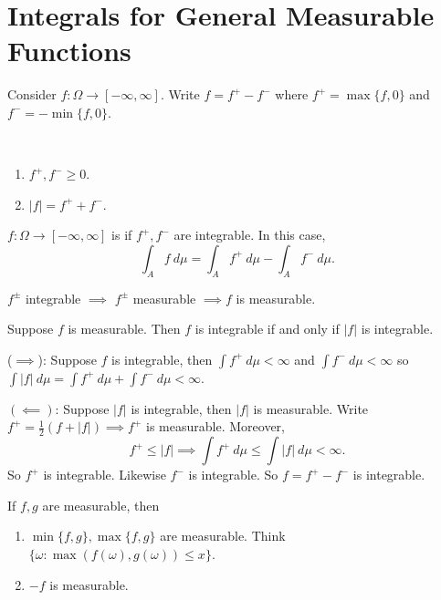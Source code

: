\documentclass[class=article,crop=false]{standalone}
\begin{document}
\section*{Integrals for General Measurable Functions}

Consider $ f: \Omega \to [-\infty, \infty]$. Write $ f=f^{+} - f^{-}$ where $ f^{+} = \max\{f,0\}$ and $ f^{-}= -\min \{f,0\} $.
\begin{note}
~\begin{enumerate}[label=\arabic*)]
	\item $ f^{+}, f^{-} \geq 0$.
	\item $ |f| = f^{+}+ f^{-}$.
\end{enumerate}
\end{note}

\begin{defn}[integrable]
	$ f: \Omega \to [-\infty,\infty]$ is  if $ f^{+}, f^{-}$ are integrable. In this case,
	\[
	\int_{A} f\ d \mu = \int_A f^{+}\ d \mu - \int_{  A} f^{-} \ d  \mu 
	.\] 
\end{defn}

\begin{note}
$ f^{\pm}$ integrable $ \implies $ $ f^{\pm}$ measurable $ \implies f$ is measurable. 
\end{note}

\begin{thm}
Suppose $ f$ is measurable. Then  $ f$ is integrable if and only if  $ |f|$ is integrable.
\end{thm}

\begin{prf}
	($ \implies$): Suppose $ f$ is integrable, then  $ \int  f^{+} \ d  \mu < \infty$ and $ \int  f^{-} \ d  \mu <\infty$ so $ \int  |f| \ d  \mu = \int  f^{+} \ d  \mu + \int  f^{-} \ d  \mu < \infty$.

	$ (\impliedby)$: Suppose $ |f|$ is integrable, then  $ |f|$ is measurable. Write $ f^{+}= \frac{1}{2}(f+ |f|) \implies f^{+}$ is measurable. Moreover, 
	\[
	f^{+}\leq |f| \implies \int  f^{+} \ d  \mu  \leq \int  |f| \ d  \mu <\infty 
	.\] 
	So $ f^{+}$ is integrable. Likewise $ f^{-}$ is integrable. So $ f=f^{+}-f^{-}$ is integrable.
\end{prf}

\begin{claim}
If $ f,g$ are measurable, then
 \begin{enumerate}[label=\arabic*)]
	 \item $\min \{f,g\} , \max \{f,g\} $ are measurable. Think $ \{\omega: \max(f(\omega),g(\omega)) \leq x\} $.
	\item $ -f$ is measurable.
\end{enumerate}
\end{claim}
\end{document}

